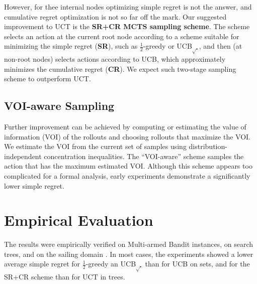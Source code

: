 \documentclass[letterpaper]{article}
\begin{document}
However, for thee internal nodes optimizing simple regret is not the
answer, and cumulative regret optimization is not so far off the
mark. Our suggested improvement to UCT is the \textbf{SR+CR MCTS
  sampling scheme}. The scheme selects an action at the current
root node according to a scheme suitable for minimizing the simple
regret (\textbf{SR}), such as $\frac 1 2$-greedy or
UCB$_{\sqrt{\cdot}}$, and then (at non-root nodes) selects actions
according to UCB, which approximately minimizes the cumulative regret
(\textbf{CR}).  We expect such two-stage sampling scheme to outperform
UCT.


\subsection{VOI-aware Sampling}
\label{sec:voi-sampling}

Further improvement can be achieved by computing or estimating the
value of information (VOI) of the rollouts and choosing rollouts that
maximize the VOI. We estimate the VOI from
the current set of samples using distribution-independent concentration inequalities.
The ``VOI-aware'' scheme samples the action that has the maximum
estimated VOI.  Although this scheme appears too complicated for
a formal analysis, early experiments demonstrate a significantly lower
simple regret.


\section{Empirical Evaluation}
\label{sec:emp}

The results were empirically verified on Multi-armed Bandit instances,
on search trees, and on the sailing domain
\cite{Kocsis.uct}. In most cases, the experiments showed a lower average
simple regret for $\frac 1 2$-greedy an UCB$_{\sqrt{\cdot}}$ than for
UCB on sets, and for the SR+CR scheme than for UCT in trees.
\end{document}
